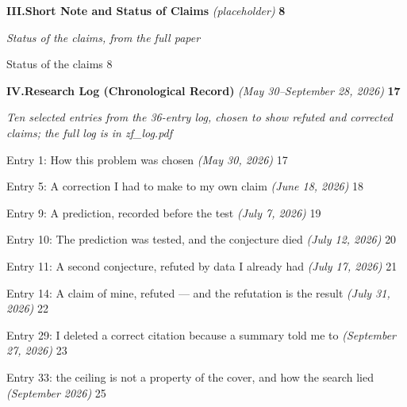 \documentclass[11pt]{article}
\begin{document}
\par\noindent\textbf{\large III.\quad \textcolor{toclink}{Short Note and Status of Claims}} \emph{(placeholder)} \dotfill \textbf{\textcolor{toclink}{8}}\par
{\small\emph{Status of the claims, from the full paper}}\par\vspace{0.25em}
\quad\small \textcolor{toclink}{Status of the claims} \dotfill \textcolor{toclink}{8}\par
\newpage
\par\noindent\textbf{\large IV.\quad \textcolor{toclink}{Research Log (Chronological Record)}} \emph{(May 30--September 28, 2026)} \dotfill \textbf{\textcolor{toclink}{17}}\par
{\small\emph{Ten selected entries from the 36-entry log, chosen to show refuted and corrected claims; the full log is in zf\_log.pdf}}\par\vspace{0.25em}
\quad\footnotesize \textcolor{toclink}{Entry 1: How this problem was chosen} \emph{(May 30, 2026)} \dotfill \textcolor{toclink}{17}\par
\quad\footnotesize \textcolor{toclink}{Entry 5: A correction I had to make to my own claim} \emph{(June 18, 2026)} \dotfill \textcolor{toclink}{18}\par
\quad\footnotesize \textcolor{toclink}{Entry 9: A prediction, recorded before the test} \emph{(July 7, 2026)} \dotfill \textcolor{toclink}{19}\par
\quad\footnotesize \textcolor{toclink}{Entry 10: The prediction was tested, and the conjecture died} \emph{(July 12, 2026)} \dotfill \textcolor{toclink}{20}\par
\quad\footnotesize \textcolor{toclink}{Entry 11: A second conjecture, refuted by data I already had} \emph{(July 17, 2026)} \dotfill \textcolor{toclink}{21}\par
\quad\footnotesize \textcolor{toclink}{Entry 14: A claim of mine, refuted --- and the refutation is the result} \emph{(July 31, 2026)} \dotfill \textcolor{toclink}{22}\par
\quad\footnotesize \textcolor{toclink}{Entry 29: I deleted a correct citation because a summary told me to} \emph{(September 27, 2026)} \dotfill \textcolor{toclink}{23}\par
\quad\footnotesize \textcolor{toclink}{Entry 33: the ceiling is not a property of the cover, and how the search lied} \emph{(September 2026)} \dotfill \textcolor{toclink}{25}\par
\end{document}
